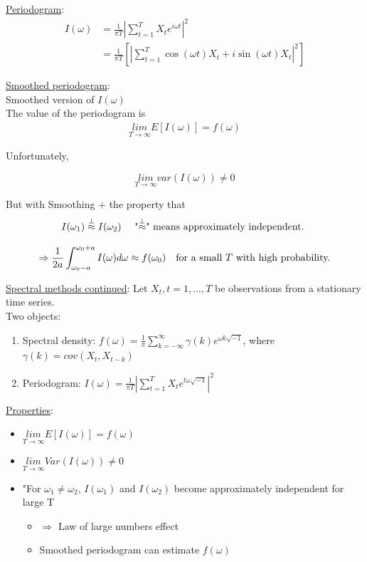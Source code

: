 \underline{Periodogram}:
\begin{align*}
    I(\omega) &= \frac{1}{\pi T} \left | \sum_{t=1}^T X_t e^{i\omega t}\right |^2\\
    &= \frac{1}{\pi T} \left[ \left| \sum_{t=1}^T \cos(\omega t)X_t + i \sin(\omega t)X_t \right |^2 \right]
\end{align*}

\underline{Smoothed periodogram}:  \\

Smoothed version of $I(\omega)$\\

The value of the periodogram is 
\begin{align*}
    \underset{T\rightarrow\infty}{lim} E\left[I(\omega) \right] = f(\omega)
\end{align*}

Unfortunately, 

\[\underset{T \rightarrow \infty}{lim} var(I(\omega)) \neq 0 \]

But with Smoothing + the property that 
\[I(\omega_1) \overset{\perp}{\approx} I(\omega_2) \text{
\quad "$\overset{\perp}{\approx}$" means approximately independent. 
} \]


\[\Rightarrow \frac{1}{2a} \int_{\omega_0 - a}^{\omega_0 + a} I(\omega)d\omega \approx f(\omega_0) \text{\quad for a small $T$ with high probability.}\]



\underline{Spectral methods continued}:
\bigskip
Let $X_t, t=1,...,T$ be observations from a stationary time series. \\

Two objects:
\begin{enumerate}
    \item Spectral density: $f(\omega)=\frac{1}{\pi} \sum_{k=-\infty}^\infty \gamma(k) e^{\omega k \sqrt{-1}}$, where $\gamma(k) = cov(X_t, X_{t-k})$
    \item Periodogram: $I(\omega) = \frac{1}{\pi T} \left| \sum_{t=1}^T X_t e^{t\omega \sqrt{-1}} \right|^2$
\end{enumerate}

\underline{Properties}: 
\begin{itemize}
    \item $\underset{T\rightarrow\infty}{lim} E\left[I(\omega) \right] = f(\omega)$ 
    \item $\underset{T\rightarrow\infty}{lim} Var(I(\omega))\neq0$
    \item "For $\omega_1 \neq \omega_2$, $I(\omega_1)$ and $I(\omega_2)$ become approximately independent for large T
    \begin{itemize}
        \item[] $\Rightarrow$ Law of large numbers effect
        \item[] Smoothed periodogram can estimate $f(\omega)$ 
    \end{itemize}
\end{itemize}


